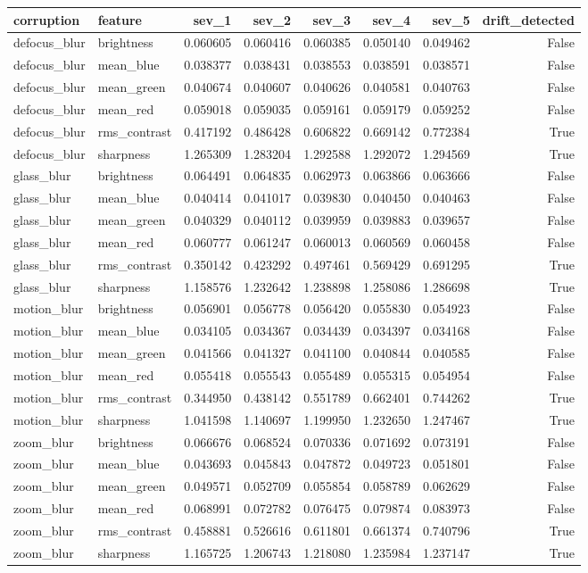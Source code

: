 \begin{tabular}{llrrrrrr}
\toprule
corruption & feature & sev_1 & sev_2 & sev_3 & sev_4 & sev_5 & drift_detected \\
\midrule
defocus_blur & brightness & 0.060605 & 0.060416 & 0.060385 & 0.050140 & 0.049462 & False \\
defocus_blur & mean_blue & 0.038377 & 0.038431 & 0.038553 & 0.038591 & 0.038571 & False \\
defocus_blur & mean_green & 0.040674 & 0.040607 & 0.040626 & 0.040581 & 0.040763 & False \\
defocus_blur & mean_red & 0.059018 & 0.059035 & 0.059161 & 0.059179 & 0.059252 & False \\
defocus_blur & rms_contrast & 0.417192 & 0.486428 & 0.606822 & 0.669142 & 0.772384 & True \\
defocus_blur & sharpness & 1.265309 & 1.283204 & 1.292588 & 1.292072 & 1.294569 & True \\
glass_blur & brightness & 0.064491 & 0.064835 & 0.062973 & 0.063866 & 0.063666 & False \\
glass_blur & mean_blue & 0.040414 & 0.041017 & 0.039830 & 0.040450 & 0.040463 & False \\
glass_blur & mean_green & 0.040329 & 0.040112 & 0.039959 & 0.039883 & 0.039657 & False \\
glass_blur & mean_red & 0.060777 & 0.061247 & 0.060013 & 0.060569 & 0.060458 & False \\
glass_blur & rms_contrast & 0.350142 & 0.423292 & 0.497461 & 0.569429 & 0.691295 & True \\
glass_blur & sharpness & 1.158576 & 1.232642 & 1.238898 & 1.258086 & 1.286698 & True \\
motion_blur & brightness & 0.056901 & 0.056778 & 0.056420 & 0.055830 & 0.054923 & False \\
motion_blur & mean_blue & 0.034105 & 0.034367 & 0.034439 & 0.034397 & 0.034168 & False \\
motion_blur & mean_green & 0.041566 & 0.041327 & 0.041100 & 0.040844 & 0.040585 & False \\
motion_blur & mean_red & 0.055418 & 0.055543 & 0.055489 & 0.055315 & 0.054954 & False \\
motion_blur & rms_contrast & 0.344950 & 0.438142 & 0.551789 & 0.662401 & 0.744262 & True \\
motion_blur & sharpness & 1.041598 & 1.140697 & 1.199950 & 1.232650 & 1.247467 & True \\
zoom_blur & brightness & 0.066676 & 0.068524 & 0.070336 & 0.071692 & 0.073191 & False \\
zoom_blur & mean_blue & 0.043693 & 0.045843 & 0.047872 & 0.049723 & 0.051801 & False \\
zoom_blur & mean_green & 0.049571 & 0.052709 & 0.055854 & 0.058789 & 0.062629 & False \\
zoom_blur & mean_red & 0.068991 & 0.072782 & 0.076475 & 0.079874 & 0.083973 & False \\
zoom_blur & rms_contrast & 0.458881 & 0.526616 & 0.611801 & 0.661374 & 0.740796 & True \\
zoom_blur & sharpness & 1.165725 & 1.206743 & 1.218080 & 1.235984 & 1.237147 & True \\
\bottomrule
\end{tabular}
